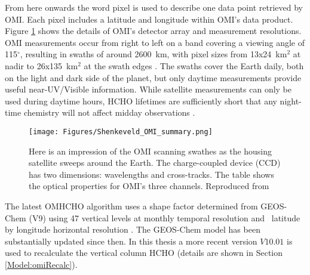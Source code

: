   
  From here onwards the word pixel is used to describe one data point retrieved by OMI.
  Each pixel includes a latitude and longitude within OMI's data product.
  Figure \ref{LR:HCHO:Sat:fig_Shenkeveld_OMI_summary} shows the details of OMI's detector array and measurement resolutions.
  OMI measurements occur from right to left on a band covering a viewing angle of 115$^{\circ}$, resulting in swaths of around 2600~km, with pixel sizes from 13x24~km$^2$ at nadir to 26x135~km$^2$ at the swath edges \parencite{Abad2015}.
  The swaths cover the Earth daily, both on the light and dark side of the planet, but only daytime measurements provide useful near-UV/Visible information.
  While satellite measurements can only be used during daytime hours, HCHO lifetimes are sufficiently short that any night-time chemistry will not affect midday observations \parencite{Wolfe2016}.
  
  \begin{figure}
    \texttt{[image: Figures/Shenkeveld\_OMI\_summary.png]}
    \caption{ %
      Here is an impression of the OMI scanning swathes as the housing satellite sweeps around the Earth.
      The charge-coupled device (CCD) has two dimensions: wavelengths and cross-tracks.
      The table shows the optical properties for OMI's three channels.
      Reproduced from \textcite{Schenkeveld2017}
    }\label{LR:HCHO:Sat:fig_Shenkeveld_OMI_summary}
  \end{figure}
  
  The latest OMHCHO algorithm uses a shape factor determined from GEOS-Chem (V9) using 47 vertical levels at monthly temporal resolution and \lowhr ~latitude by longitude horizontal resolution \parencite{Abad2015}.
  The GEOS-Chem model has been substantially updated since then.
  In this thesis a more recent version $V10.01$ is used to recalculate the vertical column HCHO (details are shown in Section \ref{Model:omiRecalc}).
  
